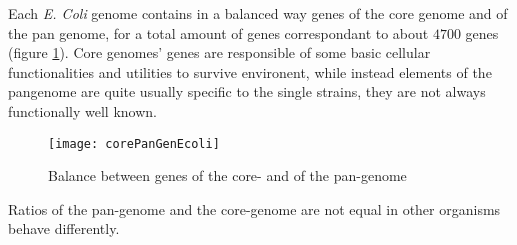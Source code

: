 Each \emph{E. Coli} genome contains in a balanced way genes of the core genome and of the pan genome, for a total amount of genes correspondant to about $4700$ genes (figure \ref{balancepancore}). Core genomes' genes are responsible of some basic cellular functionalities and utilities to survive environent, while instead elements of the pangenome are quite usually specific to the single strains, they are not always functionally well known.


\begin{figure}[h]
\caption{Balance between genes of the core- and of the pan-genome}\label{balancepancore}
\centering
\texttt{[image: corePanGenEcoli]}
\end{figure}


Ratios of the pan-genome and the core-genome are not equal in other organisms behave differently.
